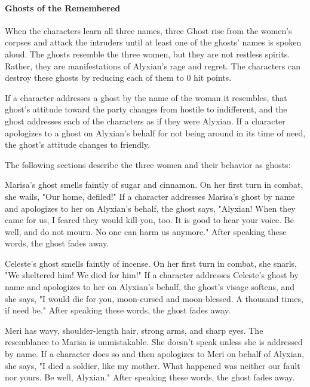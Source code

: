 \documentclass[10pt,a4paper,twoside,twocolumn,openany,nodeprecatedcode]{dndbook}
\begin{document}
\paragraph{Ghosts of the Remembered}
When the characters learn all three names, three Ghost rise from the women's corpses and attack the intruders until at least one of the ghosts' names is spoken aloud. The ghosts resemble the three women, but they are not restless spirits. Rather, they are manifestations of Alyxian's rage and regret. The characters can destroy these ghosts by reducing each of them to 0 hit points.

If a character addresses a ghost by the name of the woman it resembles, that ghost's attitude toward the party changes from hostile to indifferent, and the ghost addresses each of the characters as if they were Alyxian. If a character apologizes to a ghost on Alyxian's behalf for not being around in its time of need, the ghost's attitude changes to friendly.

The following sections describe the three women and their behavior as ghosts:


\begin{description}[nolistsep]
\item[Marisa.]
Marisa's ghost smells faintly of sugar and cinnamon. On her first turn in combat, she wails, "Our home, defiled!" If a character addresses Marisa's ghost by name and apologizes to her on Alyxian's behalf, the ghost says, "Alyxian! When they came for us, I feared they would kill you, too. It is good to hear your voice. Be well, and do not mourn. No one can harm us anymore." After speaking these words, the ghost fades away.

\item[Celeste.]
Celeste's ghost smells faintly of incense. On her first turn in combat, she snarls, "We sheltered him! We died for him!" If a character addresses Celeste's ghost by name and apologizes to her on Alyxian's behalf, the ghost's visage softens, and she says, "I would die for you, moon-cursed and moon-blessed. A thousand times, if need be." After speaking these words, the ghost fades away.


\item[Meri.]
Meri has wavy, shoulder-length hair, strong arms, and sharp eyes. The resemblance to Marisa is unmistakable. She doesn't speak unless she is addressed by name. If a character does so and then apologizes to Meri on behalf of Alyxian, she says, "I died a soldier, like my mother. What happened was neither our fault nor yours. Be well, Alyxian." After speaking these words, the ghost fades away.
\end{description}
\end{document}
